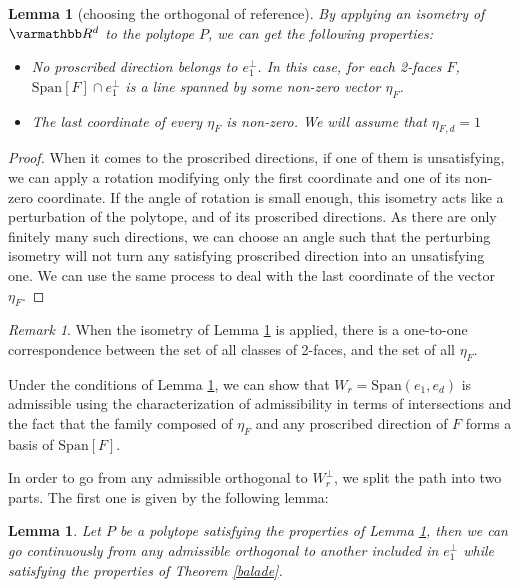 \documentclass[12pt, notitlepage]{article}
\renewcommand{\mathbb}{\varmathbb}
\theoremstyle{plain}
\theoremstyle{definition}
\theoremstyle{plain}
\newtheorem{lemma}[thm]{Lemma}
\theoremstyle{remark}
\newtheorem*{rmk}{Remark}
\theoremstyle{plain}
\theoremstyle{plain}
\newcommand{\R}{\mathbb R}
\newcommand{\vect}{\text{Span}}
\begin{document}
\begin{lemma}[choosing the orthogonal of reference]
\label{step_1}
    By applying an isometry of $\R^d$ to the polytope $P$, we can get the following properties:
    \begin{itemize}
        \item No proscribed direction belongs to $e_1^\perp$. In this case, for each 2-faces $F$, $\vect[F]\cap e_1^\perp$ is a line spanned by some non-zero vector $\eta_F$.
        \item  The last coordinate of every $\eta_F$ is non-zero. We will assume that $\eta_{F,d}=1$
    \end{itemize}
\end{lemma}

\begin{proof}
    When it comes to the proscribed directions, if one of them is unsatisfying, we can apply a rotation modifying only the first coordinate and one of its non-zero coordinate. If the angle of rotation is small enough, this isometry acts like a perturbation of the polytope, and of its proscribed directions. As there are only finitely many such directions, we can choose an angle such that the perturbing isometry will not turn any satisfying proscribed direction into an unsatisfying one. We can use the same process to deal with the last coordinate of the vector $\eta_F$.
\end{proof}

\begin{rmk}
    When the isometry of Lemma \ref{step_1} is applied, there is a one-to-one correspondence between the set of all classes of 2-faces, and the set of all $\eta_F$.
\end{rmk}

Under the conditions of Lemma \ref{step_1}, we can show that $W_r = \vect(e_1,e_d)$ is admissible using the characterization of admissibility in terms of intersections and the fact that the family composed of $\eta_F$ and any proscribed direction of $F$ forms a basis of $\vect[F]$.

In order to go from any admissible orthogonal to $W_r^\perp$, we split the path into two parts. The first one is given by the following lemma:

\begin{lemma}
\label{step_2}
Let $P$ be a polytope satisfying the properties of Lemma \ref{step_1}, then we can go continuously from any admissible orthogonal to another included in $e_1^\perp$ while satisfying the properties of Theorem \ref{balade}.
\end{lemma}
\end{document}
